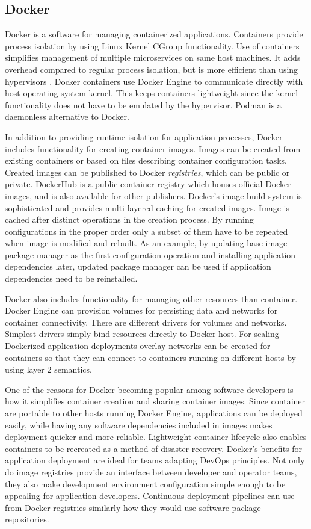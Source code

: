\subsection{Docker}

Docker \cite{bernstein2014containers} is a software for managing containerized
applications. Containers provide process isolation by using Linux Kernel
CGroup \cite{cgroup} functionality. Use of containers simplifies management of
multiple microservices on same host machines. It adds overhead compared to
regular process isolation, but is more efficient than using hypervisors
\cite{soltesz2007container-based}. Docker containers use Docker Engine to
communicate directly with host operating system kernel. This keeps containers
lightweight since the kernel functionality does not have to be emulated by the
hypervisor. Podman \cite{podman} is a daemonless alternative to Docker.

In addition to providing runtime isolation for application processes, Docker
includes functionality for creating container images. Images can be created
from existing containers or based on files describing container configuration
tasks. Created images can be published to Docker \textit{registries}, which can
be public or private. DockerHub is a public container registry which houses
official Docker images, and is also available for other publishers. Docker's
image build system is sophisticated and provides multi-layered caching for
created images. Image is cached after distinct operations in the creation
process. By running configurations in the proper order only a subset of them
have to be repeated when image is modified and rebuilt. As an example, by
updating base image package manager as the first configuration operation and
installing application dependencies later, updated package manager can be used
if application dependencies need to be reinstalled.

Docker also includes functionality for managing other resources than container.
Docker Engine can provision volumes for persisting data and networks for
container connectivity. There are different drivers for volumes and networks.
Simplest drivers simply bind resources directly to Docker host. For scaling
Dockerized application deployments overlay networks can be created for
containers so that they can connect to containers running on different hosts by
using layer 2 semantics.

One of the reasons for Docker becoming popular among software developers is how
it simplifies container creation and sharing container images. Since container
are portable to other hosts running Docker Engine, applications can be deployed
easily, while having any software dependencies included in images makes
deployment quicker and more reliable. Lightweight container lifecycle also
enables containers to be recreated as a method of disaster recovery. Docker's
benefits for application deployment are ideal for teams adapting DevOps
principles. Not only do image registries provide an interface between developer
and operator teams, they also make development environment configuration simple
enough to be appealing for application developers. Continuous deployment
pipelines can use from Docker registries similarly how they would use software
package repositories.

